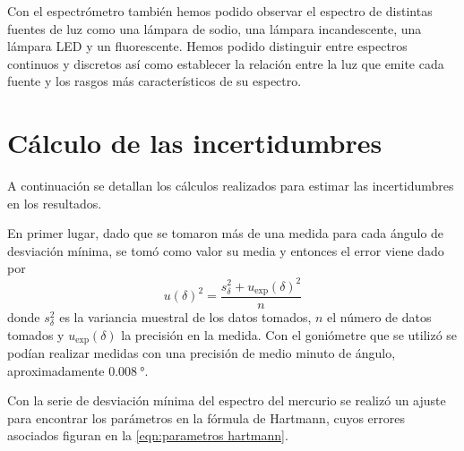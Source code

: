 \documentclass[12pt]{article}
\numberwithin{table}{section}
\numberwithin{figure}{section}
\numberwithin{equation}{section}
\begin{document}
Con el espectrómetro también hemos podido observar el espectro de distintas fuentes de luz como una lámpara de sodio, una lámpara incandescente, una lámpara LED y un fluorescente. Hemos podido distinguir entre espectros continuos y discretos así como establecer la relación entre la luz que emite cada fuente y los rasgos más característicos de su espectro.

\newpage
\appendix
\section{Cálculo de las incertidumbres}\label{sec:errores}
A continuación se detallan los cálculos realizados para estimar las incertidumbres en los resultados.

En primer lugar, dado que se tomaron más de una medida para cada ángulo de desviación mínima, se tomó como valor su media y entonces el error viene dado por
\begin{equation} \label{eqn:error desviacion}
	u(\delta)^2 = \frac{s^2_{\delta} + u_\text{exp}(\delta)^2}{n}
\end{equation}
donde \( s^2_{\delta} \) es la variancia muestral de los datos tomados, \( n \) el número de datos tomados y \( u_\text{exp}(\delta) \) la precisión en la medida. Con el goniómetre que se utilizó se podían realizar medidas con una precisión de medio minuto de ángulo, aproximadamente \( \SI{0.008}{\degree} \).

Con la serie de desviación mínima del espectro del mercurio se realizó un ajuste para encontrar los parámetros en la fórmula de Hartmann, cuyos errores asociados figuran en la \cref{eqn:parametros hartmann}.
\end{document}
